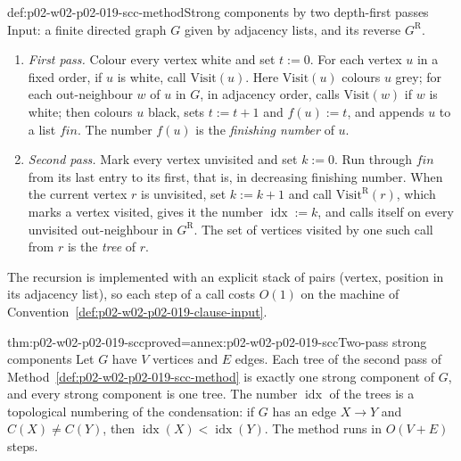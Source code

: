 \begin{hbmethod}{def:p02-w02-p02-019-scc-method}{Strong components by two depth-first passes}
Input: a finite directed graph \(G\) given by adjacency lists, and its reverse
\(G^{\mathrm R}\).
\begin{enumerate}
  \item \emph{First pass.}  Colour every vertex white and set \(t:=0\).  For
        each vertex \(u\) in a fixed order, if \(u\) is white, call
        \(\mathrm{Visit}(u)\).  Here \(\mathrm{Visit}(u)\) colours \(u\) grey;
        for each out-neighbour \(w\) of \(u\) in \(G\), in adjacency order,
        calls \(\mathrm{Visit}(w)\) if \(w\) is white; then colours \(u\)
        black, sets \(t:=t+1\) and \(f(u):=t\), and appends \(u\) to a list
        \(\mathit{fin}\).  The number \(f(u)\) is the \emph{finishing
        number} of \(u\).
  \item \emph{Second pass.}  Mark every vertex unvisited and set \(k:=0\).
        Run through \(\mathit{fin}\) from its last entry to its first, that
        is, in decreasing finishing number.  When the current vertex \(r\) is
        unvisited, set \(k:=k+1\) and call \(\mathrm{Visit}^{\mathrm R}(r)\),
        which marks a vertex visited, gives it the number
        \(\operatorname{idx}:=k\), and calls itself on every unvisited
        out-neighbour in \(G^{\mathrm R}\).  The set of vertices visited by
        one such call from \(r\) is the \emph{tree} of \(r\).
\end{enumerate}
The recursion is implemented with an explicit stack of pairs (vertex, position
in its adjacency list), so each step of a call costs \(O(1)\) on the machine of
Convention~\ref{def:p02-w02-p02-019-clause-input}.
\end{hbmethod}

\begin{hbtheorem}{thm:p02-w02-p02-019-scc}{proved=annex:p02-w02-p02-019-scc}{Two-pass strong components}
Let \(G\) have \(V\) vertices and \(E\) edges.  Each tree of the second pass of
Method~\ref{def:p02-w02-p02-019-scc-method} is exactly one strong component of
\(G\), and every strong component is one tree.  The number
\(\operatorname{idx}\) of the trees is a topological numbering of the
condensation: if \(G\) has an edge \(X\to Y\) and \(C(X)\neq C(Y)\), then
\(\operatorname{idx}(X)<\operatorname{idx}(Y)\).  The method runs in
\(O(V+E)\) steps.
\end{hbtheorem}

